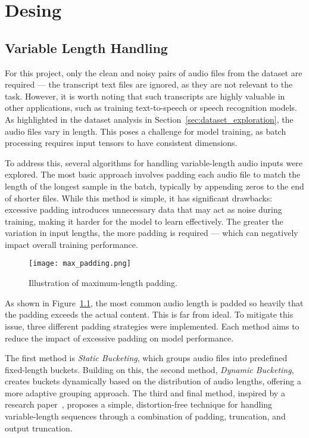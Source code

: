 \graphicspath{{content/chapters/5_design/figures/}}
\chapter{Desing}
\label{chp:design}

\section{Variable Length Handling}
\label{sec:variable_length_handling}

For this project, only the clean and noisy pairs of audio files from the dataset are required — the transcript text files are ignored, as they are not relevant to the task. However, it is worth noting that such transcripts are highly valuable in other applications, such as training text-to-speech or speech recognition models. As highlighted in the dataset analysis in Section~\ref{sec:dataset_exploration}, the audio files vary in length. This poses a challenge for model training, as batch processing requires input tensors to have consistent dimensions.

To address this, several algorithms for handling variable-length audio inputs were explored. The most basic approach involves padding each audio file to match the length of the longest sample in the batch, typically by appending zeros to the end of shorter files. While this method is simple, it has significant drawbacks: excessive padding introduces unnecessary data that may act as noise during training, making it harder for the model to learn effectively. The greater the variation in input lengths, the more padding is required — which can negatively impact overall training performance.

\begin{figure}[h]
    \centering
    \texttt{[image: max\_padding.png]}
    \caption{\label{fig:max_padding}Illustration of maximum-length padding.}
\end{figure}

As shown in Figure~\ref{fig:max_padding}, the most common audio length is padded so heavily that the padding exceeds the actual content. This is far from ideal. To mitigate this issue, three different padding strategies were implemented. Each method aims to reduce the impact of excessive padding on model performance.

The first method is \textit{Static Bucketing}, which groups audio files into predefined fixed-length buckets. Building on this, the second method, \textit{Dynamic Bucketing}, creates buckets dynamically based on the distribution of audio lengths, offering a more adaptive grouping approach. The third and final method, inspired by a research paper~\cite{yoon2020pto}, proposes a simple, distortion-free technique for handling variable-length sequences through a combination of padding, truncation, and output truncation.

